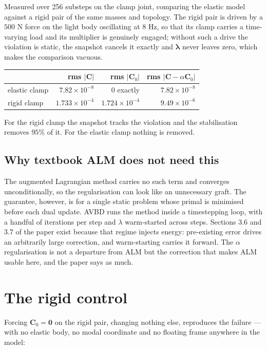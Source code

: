 \documentclass[11pt,a4paper]{article}
\begin{document}
Measured over 256 substeps on the clamp joint, comparing the elastic model against a rigid pair
of the same masses and topology. The rigid pair is driven by a $500$ N force on the light body
oscillating at $8$ Hz, so that its clamp carries a time-varying load and its multiplier is
genuinely engaged; without such a drive the violation is static, the snapshot cancels it exactly
and $\bm{\lambda}$ never leaves zero, which makes the comparison vacuous.

\begin{center}\small
\begin{tabular}{@{}lrrr@{}}
\toprule
 & rms $\lvert\mathbf{C}\rvert$ & rms $\lvert\mathbf{C}_0\rvert$ & rms $\lvert\mathbf{C}-\alpha\mathbf{C}_0\rvert$ \\
\midrule
elastic clamp & $7.82\times10^{-8}$ & $0$ exactly      & $7.82\times10^{-8}$ \\
rigid clamp   & $1.733\times10^{-4}$ & $1.724\times10^{-4}$ & $9.49\times10^{-6}$ \\
\bottomrule
\end{tabular}
\end{center}

For the rigid clamp the snapshot tracks the violation and the stabilisation removes $95\%$ of
it. For the elastic clamp nothing is removed.

\subsection{Why textbook ALM does not need this}

The augmented Lagrangian method carries no such term and converges unconditionally, so the
regularisation can look like an unnecessary graft. The guarantee, however, is for a single
static problem whose primal is minimised before each dual update. AVBD runs the method inside a
timestepping loop, with a handful of iterations per step and $\lambda$ warm-started across
steps. Sections 3.6 and 3.7 of the paper exist because that regime injects energy: pre-existing
error drives an arbitrarily large correction, and warm-starting carries it forward. The
$\alpha$ regularisation is not a departure from ALM but the correction that makes ALM usable
here, and the paper says as much.

\section{The rigid control}

Forcing $\mathbf{C}_0 = \mathbf{0}$ on the rigid pair, changing nothing else, reproduces the
failure --- with no elastic body, no modal coordinate and no floating frame anywhere in the
model:
\end{document}
